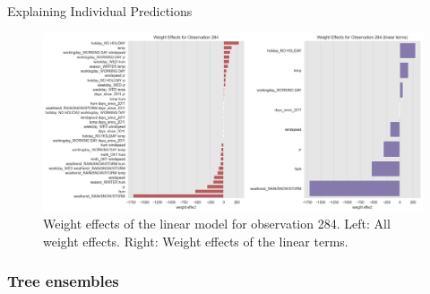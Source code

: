 \documentclass[10pt]{beamer}
\begin{document}
\begin{frame}{Explaining Individual Predictions}
\begin{center}
  \begin{figure}
    \includegraphics[scale=0.3]{images/interpretable_ml_72_0.png}
    \caption{Weight effects of the linear model for observation 284. Left: All weight effects. Right: Weight effects of the linear terms.}\label{fig:linear-284-obs}
  \end{figure}
\end{center}
\end{frame}

\subsubsection{Tree ensembles}
\end{document}
